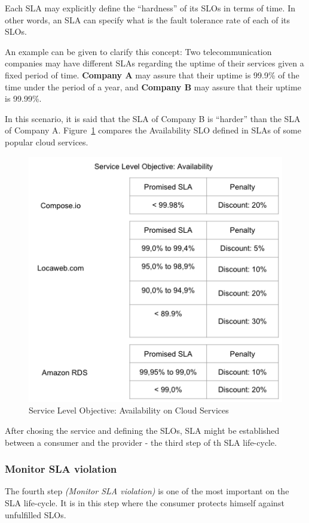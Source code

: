 Each SLA may explicitly define the ``hardness'' of its SLOs in terms of time. In other words, an SLA can specify what is the fault tolerance rate of each of its SLOs. 

An example can be given to clarify this concept: Two telecommunication companies may have different SLAs regarding the uptime of their services given a fixed period of time. \textbf{Company A} may assure that their uptime is 99.9\% of the time under the period of a year, and \textbf{Company B} may assure that their uptime is 99.99\%. 

In this scenario, it is said that the SLA of Company B is ``harder'' than the SLA of Company A. Figure~\ref{fig:sla-agreement} compares the Availability SLO defined in SLAs of some popular cloud services.

\begin{figure}[ht!]
\centering
\includegraphics[width=120mm]{slo-cloudServices.png}
\caption{Service Level Objective: Availability on Cloud Services \cite{locawebsla}\cite{composesla}\cite{amazonrdssla}}\label{fig:sla-agreement}
\end{figure}

After chosing the service and defining the SLOs, SLA might be established between a consumer and the provider - the third step of th SLA life-cycle. 

\subsubsection{Monitor SLA violation}
The fourth step \textit{(Monitor SLA violation)} is one of the most important on the SLA life-cycle. It is in this step where the consumer protects himself against unfulfilled SLOs. 

